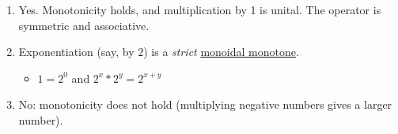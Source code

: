 \begin{enumerate}
    \item   Yes. Monotonicity holds, and multiplication by 1 is unital. The operator is symmetric and associative.
    \item Exponentiation (say, by $2$) is a \emph{strict} \href{doc/1 math/Seven Sketches in Compositionality/Chapter 2: Resource theories/2 Symmetric monoidal preorders/5 Monoidal monotone maps/1 Monoidal monotone}{monoidal monotone}.
          \begin{itemize}
            \item $1 = 2^0$ and $2^x * 2^y = 2^{x+y}$
          \end{itemize}
    \item No: monotonicity does not hold (multiplying negative numbers gives a larger number).

  \end{enumerate}
